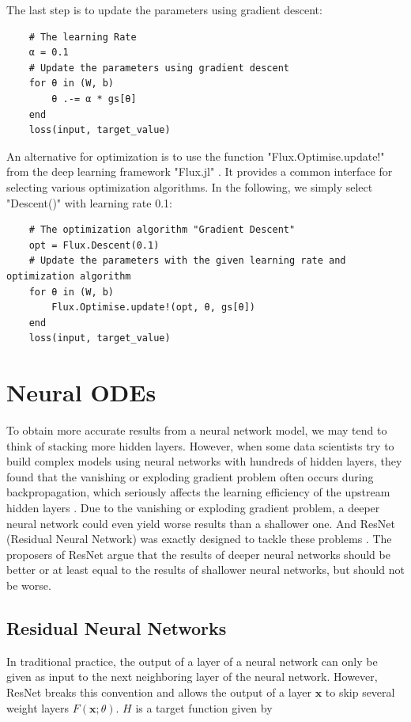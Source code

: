 \documentclass[
	parskip, 			   %
	twoside, 			   %
	DIV=14, 			   %
	BCOR=15.0mm, 		   %
	headsepline, 		   %
	open=right, 		   %
	captions=tableheading, %
	bibliography=totoc,    %
	numbers=noenddot       %
]{scrreprt}
\begin{document}
The last step is to update the parameters using gradient descent:

\begin{verbatim}
    # The learning Rate
    α = 0.1
    # Update the parameters using gradient descent
    for θ in (W, b)
        θ .-= α * gs[θ]
    end
    loss(input, target_value)
\end{verbatim}

An alternative for optimization is to use the function "Flux.Optimise.update!" from the deep learning framework "Flux.jl" \cite{Flux.jl-2018} \cite{innes:2018}. It provides a common interface for selecting various optimization algorithms. In the following, we simply select "Descent()" with learning rate 0.1:

\begin{verbatim}
    # The optimization algorithm "Gradient Descent"
    opt = Flux.Descent(0.1)
    # Update the parameters with the given learning rate and optimization algorithm
    for θ in (W, b)
        Flux.Optimise.update!(opt, θ, gs[θ])
    end
    loss(input, target_value)
\end{verbatim}


\clearpage
\chapter{Neural ODEs}
\label{ch:chapter5}
To obtain more accurate results from a neural network model, we may tend to think of stacking more hidden layers. However, when some data scientists try to build complex models using neural networks with hundreds of hidden layers, they found that the vanishing or exploding gradient problem often occurs during backpropagation, which seriously affects the learning efficiency of the upstream hidden layers \cite{glorot2010understanding}. Due to the vanishing or exploding gradient problem, a deeper neural network could even yield worse results than a shallower one. And ResNet (Residual Neural Network) was exactly designed to tackle these problems \cite{he2016deep}. The proposers of ResNet argue that the results of deeper neural networks should be better or at least equal to the results of shallower neural networks, but should not be worse.

\section{Residual Neural Networks}
In traditional practice, the output of a layer of a neural network can only be given as input to the next neighboring layer of the neural network. However, ResNet breaks this convention and allows the output of a layer $\mathbf{x}$ to skip several weight layers $F(\mathbf{x};\theta)$. $H$ is a target function given by
\end{document}
